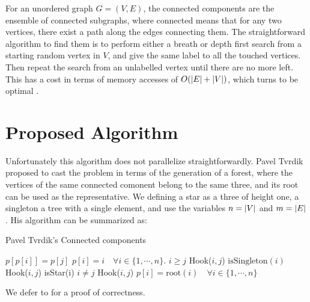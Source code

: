 %

For an unordered graph $G=(V,E)$, the connected components are the ensemble
of connected subgraphs, where connected means that for any two  vertices, there exist a path along the
 edges connecting them.
The straightforward algorithm to find them is to perform either a breath or depth first search from a starting
random vertex in $V$, and give the same label to all the touched vertices. Then repeat the search from an unlabelled vertex
until there are no more left.
This has a cost in terms of memory accesses of $O(\left| E \right| + \left| V \right|)$, which turns to be optimal \cite{Hopcroft}.

\section{Proposed Algorithm}\label{sec:yourmethod}
%
%

Unfortunately this algorithm does not parallelize straightforwardly. Pavel Tvrdik \cite{PCompClass}
proposed to cast the problem in terms of the generation of a forest, where the vertices of the same connected comonent belong
to the same three, and its root can be used as the representative.
We defining a star as a three of height one, a singleton a tree with a single element, and use the variables
 $n=\left| V \right|$ and $m=\left| E \right|$.
His algorithm can be summarized as:

\begin{algorithm}%
    \caption{Pavel Tvrdik's Connected components}
    \label{algorithm:cc1}
    \begin{algorithmic}[1]
          \State $p[p[i]] = p[j]$
        \EndProcedure
          \State $p[i] = i \quad \forall i \in \{1,\cdots, n\}$. 
         
          \State  \kif $i\ge j$ \kthen Hook($i, j$)
          \State  \kif $\text{isSingleton}(i)$ \kthen Hook($i, j$)
        \EndFor
         
          \State  \kif isStar(i) \kand $i \neq j$ \kthen Hook($i, j$)
        \EndFor
        \State $p[i] = \text{root}(i) \quad \forall i \in \{1,\cdots, n\}$ 
        \EndWhile
        \EndProcedure
   \end{algorithmic}
\end{algorithm}
We defer to \cite{PCompClass} for a proof of correctness.

